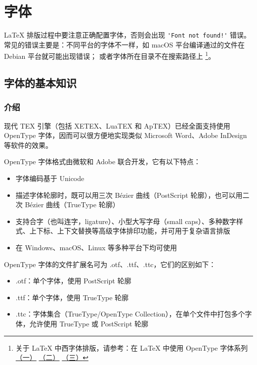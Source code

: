 \chapter{字体}

{\LaTeX} 排版过程中要注意正确配置字体，否则会出现 \verb|'Font not found!'| 错误。
常见的错误主要是：不同平台的字体不一样，如 macOS 平台编译通过的文件在 Debian 平台就可能出现错误；
或者字体所在目录不在搜索路径上
\footnote{
关于 {\LaTeX} 中西字体排版，请参考：在 {\LaTeX} 中使用 OpenType 字体系列
\href{https://stone-zeng.github.io/2018-08-08-use-opentype-fonts}{（一）}
\href{https://stone-zeng.github.io/2019-07-06-use-opentype-fonts-ii}{（二）}
\href{https://stone-zeng.github.io/2020-05-02-use-opentype-fonts-iii/}{（三）}
}。

\section{字体的基本知识}

\subsection{介绍}
现代 TEX 引擎（包括 X⁠E⁠TEX、Lua­TEX 和 Ap­TEX）已经全面支持使用 OpenType 字体，因而可以很方便地实现类似 Microsoft Word、Adobe InDesign 等软件的效果。

OpenType 字体格式由微软和 Adobe 联合开发，它有以下特点：

\begin{itemize}
  \item 字体编码基于 Unicode
  \item 描述字体轮廓时，既可以用三次 Bézier 曲线（PostScript 轮廓），也可以用二次 Bézier 曲线（TrueType 轮廓）
  \item 支持合字（也叫连字，ligature）、小型大写字母（small caps）、多种数字样式、上下标、上下文替换等高级字体排印功能，并可用于复杂语言排版
  \item 在 Windows、macOS、Linux 等多种平台下均可使用
\end{itemize}

OpenType 字体的文件扩展名可为 .otf、.ttf、.ttc，它们的区别如下：

\begin{itemize}
  \item .otf：单个字体，使用 PostScript 轮廓
  \item .ttf：单个字体，使用 TrueType 轮廓
  \item .ttc：字体集合（TrueType/OpenType Collection），在单个文件中打包多个字体，允许使用 TrueType 或 PostScript 轮廓
\end{itemize}

